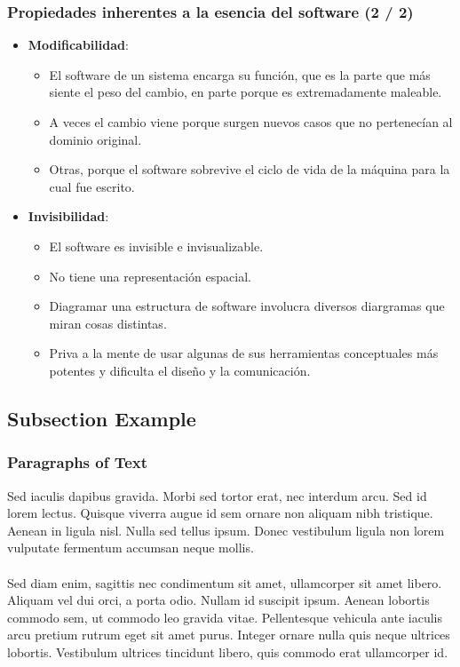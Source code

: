 \documentclass{beamer}
\begin{document}
\begin{frame}
\frametitle{Propiedades inherentes a la esencia del software (2 / 2)}
\begin{itemize}
	\item \textbf{Modificabilidad}:
			\begin{itemize}
				\item El software de un sistema encarga su función, que es la parte que más siente el peso del cambio, en parte porque es extremadamente maleable.
				\item A veces el cambio viene porque surgen nuevos casos que no pertenecían al dominio original.
				\item Otras, porque el software sobrevive el ciclo de vida de la máquina para la cual fue escrito.			
			\end{itemize}
	\item \textbf{Invisibilidad}:
			\begin{itemize}
				\item El software es invisible e invisualizable.
				\item No tiene una representación espacial.
				\item Diagramar una estructura de software involucra diversos diargramas que miran cosas distintas.
				\item Priva a la mente de usar algunas de sus herramientas conceptuales más potentes y dificulta el diseño y la comunicación. 			
			\end{itemize}
	  
\end{itemize}

\end{frame}



\subsection{Subsection Example} %

\begin{frame}
\frametitle{Paragraphs of Text}
Sed iaculis dapibus gravida. Morbi sed tortor erat, nec interdum arcu. Sed id lorem lectus. Quisque viverra augue id sem ornare non aliquam nibh tristique. Aenean in ligula nisl. Nulla sed tellus ipsum. Donec vestibulum ligula non lorem vulputate fermentum accumsan neque mollis.\\~\\

Sed diam enim, sagittis nec condimentum sit amet, ullamcorper sit amet libero. Aliquam vel dui orci, a porta odio. Nullam id suscipit ipsum. Aenean lobortis commodo sem, ut commodo leo gravida vitae. Pellentesque vehicula ante iaculis arcu pretium rutrum eget sit amet purus. Integer ornare nulla quis neque ultrices lobortis. Vestibulum ultrices tincidunt libero, quis commodo erat ullamcorper id.
\end{frame}
\end{document}
